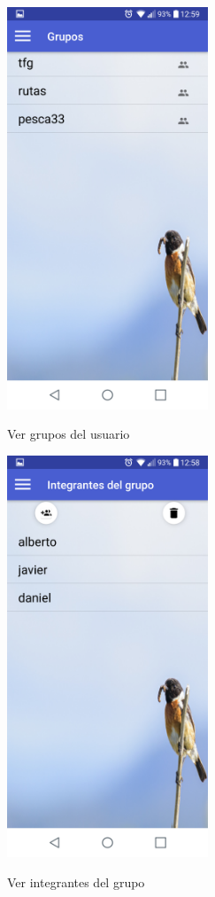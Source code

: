 \begin{figure}[htbp]
\begin{minipage}[b]{0.5\linewidth} %
\centering
\includegraphics[width=6cm]{capturamovil/vergrupos.png}
 \label{figura1}
\caption{Ver grupos del usuario}

\end{minipage}
\hspace{0.5cm} %
\begin{minipage}[b]{0.5\linewidth}
\centering
\includegraphics[width=6cm]{capturamovil/verintegrantes.png}
 \label{figura2}
\caption{Ver integrantes del grupo }

\end{minipage}
\end{figure}
\newpage
